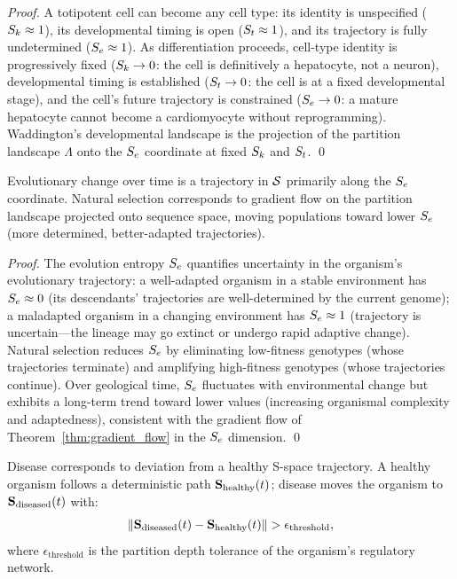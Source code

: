 \begin{proof}
A totipotent cell can become any cell type: its identity is unspecified
($S_k \approx 1$), its developmental timing is open ($S_t \approx 1$), and
its trajectory is fully undetermined ($S_e \approx 1$). As differentiation
proceeds, cell-type identity is progressively fixed ($S_k \to 0$: the cell
is definitively a hepatocyte, not a neuron), developmental timing is
established ($S_t \to 0$: the cell is at a fixed developmental stage), and
the cell's future trajectory is constrained ($S_e \to 0$: a mature hepatocyte
cannot become a cardiomyocyte without reprogramming). Waddington's developmental
landscape is the projection of the partition landscape $\Lambda$ onto the
$S_e$ coordinate at fixed $S_k$ and $S_t$. \qed
\end{proof}

\begin{proposition}
\label{prop:evolution_trajectory}
Evolutionary change over time is a trajectory in $\mathcal{S}$ primarily along
the $S_e$ coordinate. Natural selection corresponds to gradient flow on the
partition landscape projected onto sequence space, moving populations toward
lower $S_e$ (more determined, better-adapted trajectories).
\end{proposition}

\begin{proof}
The evolution entropy $S_e$ quantifies uncertainty in the organism's evolutionary
trajectory: a well-adapted organism in a stable environment has $S_e \approx 0$
(its descendants' trajectories are well-determined by the current genome);
a maladapted organism in a changing environment has $S_e \approx 1$ (trajectory
is uncertain---the lineage may go extinct or undergo rapid adaptive change).
Natural selection reduces $S_e$ by eliminating low-fitness genotypes (whose
trajectories terminate) and amplifying high-fitness genotypes (whose trajectories
continue). Over geological time, $S_e$ fluctuates with environmental change
but exhibits a long-term trend toward lower values (increasing organismal
complexity and adaptedness), consistent with the gradient flow of
Theorem~\ref{thm:gradient_flow} in the $S_e$ dimension. \qed
\end{proof}

\begin{proposition}
\label{prop:disease}
Disease corresponds to deviation from a healthy S-space trajectory. A healthy
organism follows a deterministic path $\mathbf{S}_{\mathrm{healthy}}(t)$;
disease moves the organism to $\mathbf{S}_{\mathrm{diseased}}(t)$ with:
\begin{equation}
  \|\mathbf{S}_{\mathrm{diseased}}(t) - \mathbf{S}_{\mathrm{healthy}}(t)\| > \epsilon_{\mathrm{threshold}},
\end{equation}
where $\epsilon_{\mathrm{threshold}}$ is the partition depth tolerance of the
organism's regulatory network.
\end{proposition}

